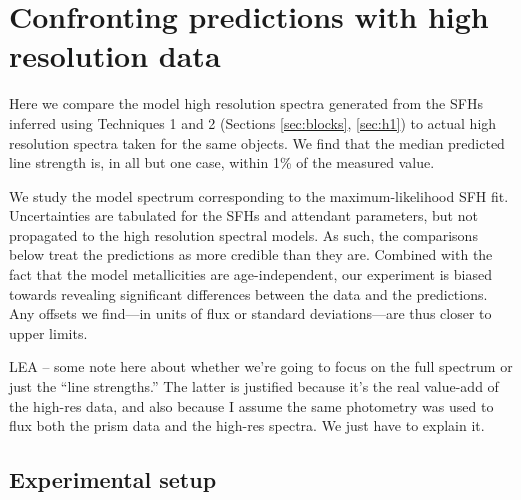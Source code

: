 \documentclass[a4paper,fleqn,usenatbib]{mnras}
\newcommand{\bfb}{\color{myblue}}
\begin{document}

\section{Confronting predictions with high resolution data}
\label{sec:results}

Here we compare the model high resolution spectra generated from the SFHs inferred using 
Techniques 1 and 2 (Sections \ref{sec:blocks}, \ref{sec:h1}) to actual high resolution spectra taken for
the same objects. We find that the median predicted line strength is, in all but one case, within 1\% 
of the measured value. 

We study the model spectrum corresponding to
the maximum-likelihood SFH fit. Uncertainties are tabulated for the SFHs and attendant 
parameters, but not propagated to the high resolution spectral models. As such,
the comparisons below treat the predictions as more credible than they are. Combined with the fact 
that the model metallicities are age-independent, our experiment is biased towards 
revealing significant differences between the data and the predictions. Any offsets we find---in units
of flux or standard deviations---are thus closer to upper limits. %

{\bfb LEA -- some note here about whether we're going to focus on the full spectrum or just the ``line
strengths.'' The latter is justified because it's the real value-add of the high-res data, and also because
I assume the same photometry was used to flux both the prism data and the high-res spectra. We
just have to explain it.}

\subsection{Experimental setup}
\label{sec:setup}
\end{document}

